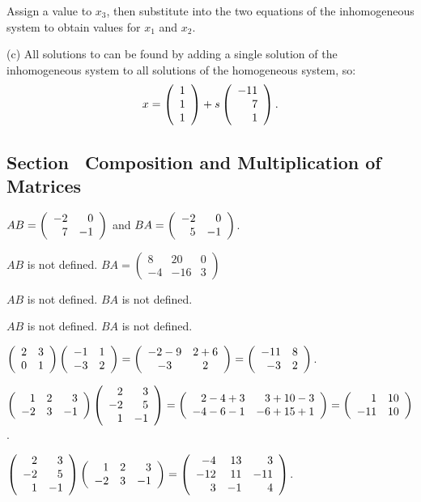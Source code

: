 \documentclass{ximera}
\begin{document}
\soln Assign a value to $x_3$, then substitute into the two equations
of the inhomogeneous system to obtain values for $x_1$ and $x_2$.

(c) All solutions to  can be found by adding a
single solution of the inhomogeneous system to all solutions
of the homogeneous system, so:
\[
x = \left(\begin{array}{r} 1 \\ 1 \\ 1\end{array}\right) + s\left(\begin{array}{r} -11 \\ 7 \\ 1\end{array}\right).
\]



\newpage
\subsection*{Section~\protect{\ref{S:4.6}} Composition and Multiplication
of Matrices}

 $AB=\left(\begin{array}{rr} -2 & 0\\ 7 &-1\end{array}\right)$ and $BA= \left(\begin{array}{rr} -2 & 0\\ 5 &-1\end{array}\right)$.

 $AB$ is not defined. $BA=\left(\begin{array}{rrr} 8 &  20 &  0\\
 -4 & -16  &  3\end{array}\right)$


 $AB$ is not defined. $BA$  is not defined.  

 $AB$ is not defined. $BA$  is not defined.


$\left(\begin{array}{rr} 2 & 3\\ 0 &1\end{array}\right)\left(\begin{array}{rr} -1 & 1\\ -3 &2\end{array}\right) =
\left(\begin{array}{cc} -2 - 9 & 2+6\\ -3 &2\end{array}\right) = \left(\begin{array}{rr} -11 & 8\\ -3 &2\end{array}\right)$.

$\left(\begin{array}{rrr} 1 & 2 & 3\\ -2 & 3 & -1 \end{array}\right)
\left(\begin{array}{rr} 2 & 3\\ -2 & 5 \\1 & -1 \end{array}\right)
= \left(\begin{array}{rr} 2 - 4 + 3 & 3 + 10 - 3\\ -4 - 6 - 1 &-6 + 15 + 1\end{array}\right)
= \left(\begin{array}{rr} 1 & 10\\ -11 &10\end{array}\right)$.

 $\left(\begin{array}{rr} 2 & 3\\ -2 & 5 \\1 & -1 \end{array}
\right) \left(\begin{array}{rrr} 1 & 2 & 3\\ -2 & 3 & -1 \end{array}\right)
= \left(\begin{array}{rrr} -4 & 13 & 3 \\ -12 & 11 & -11 \\ 3 & -1 & 4\end{array}\right)$.
\end{document}
